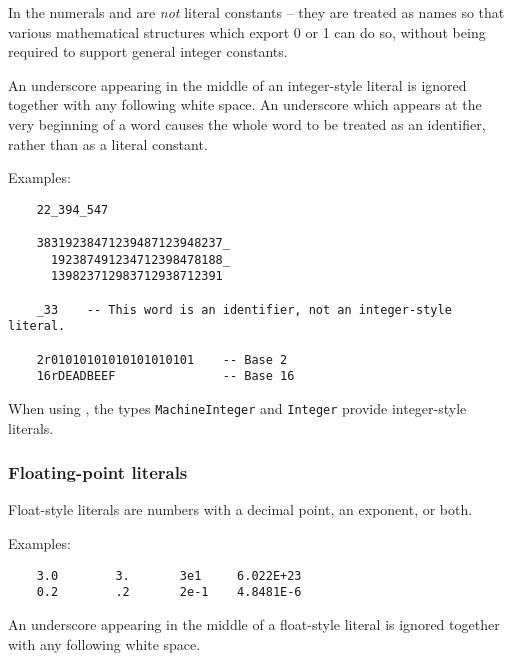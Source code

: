 
In \asharp{} the numerals  and  are {\em not\/}
literal constants -- they are treated as names so that
various mathematical structures which export 0 or 1 can do so,
without being required to support general integer constants.

An underscore appearing in the middle of an integer-style literal
is ignored together with any following white space.
An underscore which appears at the very beginning of a word
causes the whole word to be treated as an identifier, rather than
as a literal constant.

Examples:

\begin{small}
\begin{verbatim}
    22_394_547

    38319238471239487123948237_
      192387491234712398478188_
      139823712983712938712391

    _33    -- This word is an identifier, not an integer-style literal.

    2r01010101010101010101    -- Base 2
    16rDEADBEEF               -- Base 16
\end{verbatim}
\end{small}

When using \libaldor{}, the types \verb"MachineInteger"
and \verb"Integer" provide integer-style literals.


\subsubsection{Floating-point literals}

Float-style literals are numbers with a decimal point, an exponent, or both.

Examples:

\begin{small}
\begin{verbatim}
    3.0        3.       3e1     6.022E+23 
    0.2        .2       2e-1    4.8481E-6
\end{verbatim}
\end{small}

An underscore appearing in the middle of a float-style literal
is ignored together with any following white space.

